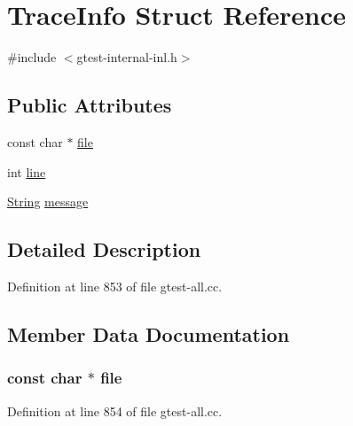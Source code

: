 \hypertarget{structtesting_1_1internal_1_1TraceInfo}{\section{\-Trace\-Info \-Struct \-Reference}
\label{d9/d68/structtesting_1_1internal_1_1TraceInfo}
}


{\ttfamily \#include $<$gtest-\/internal-\/inl.\-h$>$}

\subsection*{\-Public \-Attributes}
\begin{DoxyCompactItemize}
\item 
const char $\ast$ \hyperlink{structtesting_1_1internal_1_1TraceInfo_a29e8a72bd9d3020e517d381df2eab3cb}{file}
\item 
int \hyperlink{structtesting_1_1internal_1_1TraceInfo_a41ebd28ef1d7c6ade45642cb6acc1039}{line}
\item 
\hyperlink{classtesting_1_1internal_1_1String}{\-String} \hyperlink{structtesting_1_1internal_1_1TraceInfo_a2836db0f8ae4563c70935b5e514bdc21}{message}
\end{DoxyCompactItemize}


\subsection{\-Detailed \-Description}


\-Definition at line 853 of file gtest-\/all.\-cc.



\subsection{\-Member \-Data \-Documentation}
\hypertarget{structtesting_1_1internal_1_1TraceInfo_a29e8a72bd9d3020e517d381df2eab3cb}{
\subsubsection[{file}]{\setlength{\rightskip}{0pt plus 5cm}const char $\ast$ {\bf file}}}\label{d9/d68/structtesting_1_1internal_1_1TraceInfo_a29e8a72bd9d3020e517d381df2eab3cb}


\-Definition at line 854 of file gtest-\/all.\-cc.

